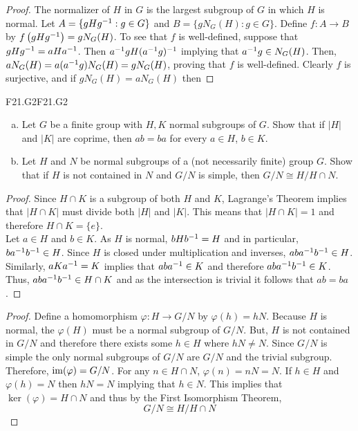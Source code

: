 \documentclass[../../AlgebraQualSolutions.tex]{subfiles}
\begin{document}
	\begin{proof}
		The normalizer of $H$ in $G$ is the largest subgroup of $G$ in which $H$ is normal. Let $A = \{gHg^{-1}: g \in G\}$ and $B = \{gN_G(H): g \in G\}$. Define $f: A \to B$ by $f\left(gHg^{-1}\right) = gN_G(H)$. To see that $f$ is well-defined, suppose that $gHg^{-1} = aHa^{-1}$. Then $a^{-1} g H  (a^{-1} g)^{-1}$ implying that $a^{-1} g \in N_G(H)$. Then, $aN_G(H) = a(a^{-1} g)N_G(H) = gN_G(H)$, proving that  $f$ is well-defined. Clearly $f$ is surjective, and if $gN_G(H) = aN_G(H)$ then 
	\end{proof}

	\begin{prob}{F21.G2}{F21.G2}
	\begin{enumerate}[(a)]
	\item Let $G$ be a finite group with $H,K$ normal subgroups of $G$. Show that if $|H|$ and $|K|$ are coprime, then $ab = ba$ for every $a \in H$, $b \in K$.
	\item Let $H$ and $N$ be normal subgroups of a (not necessarily finite) group $G$. Show that if $H$ is not contained in $N$ and $G/N$ is simple, then $G/N \cong H/H\cap N$.
	\end{enumerate}
	\end{prob}
	
	\begin{proof}
	Since  $H \cap K$ is a subgroup of both $H$ and $K$, Lagrange's Theorem implies that $|H \cap K|$ must divide both $|H|$ and $|K|$. This means that $|H \cap K| =1$ and therefore $H \cap K = \{e\}$.\\
	
	Let $a \in H$ and $b \in K$. As $H$ is normal, $bHb^{-1} = H$ and in particular, $ba^{-1} b^{-1} \in H$. Since $H$ is closed under multiplication and inverses, $aba^{-1} b^{-1} \in H$. Similarly, $aK a^{-1} = K$ implies that $aba^{-1} \in K$ and therefore $aba^{-1} b^{-1} \in K$. Thus, $aba^{-1} b^{-1} \in H \cap K$ and as the intersection is trivial it follows that $ab =ba$.
	\end{proof}
	
	\begin{proof}
	Define a homomorphism $\varphi: H \to G/N$ by $\varphi(h) = hN$. Because $H$ is normal, the $\varphi(H)$ must be a normal subgroup of $G/N$. But, $H$ is not contained in $G/N$ and therefore there exists some $h\in H$ where $hN \neq N$. Since $G/N$ is simple the only normal subgroups of $G/N$ are $G/N$ and the trivial subgroup. Therefore, $\mathrm{im}(\varphi) = G/N$. For any $n \in H \cap N$, $\varphi(n) = nN = N$. If $h \in H$ and $\varphi(h) = N$ then $hN = N$ implying that $h \in N$. This implies that $\ker(\varphi) = H\cap N$ and thus by the First Isomorphism Theorem,
		\[G/N \cong H/H\cap N\]
	\end{proof}
\end{document}

